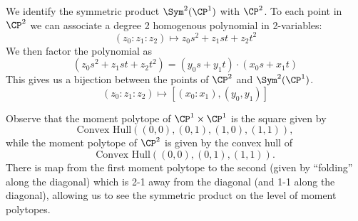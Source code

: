 


    We identify the symmetric product $\Sym^2(\CP^1)$ with $\CP^2$. To each point in $\CP^2$ we can associate a degree 2 homogenous polynomial in 2-variables:
    \[(z_0:z_1:z_2)\mapsto z_0 s^2 + z_1 st + z_2 t^2\]
    We then factor the polynomial as
    \[( z_0 s^2 + z_1 st + z_2 t^2)=(y_0 s + y_1 t)\cdot (x_0 s + x_1 t)\]
    This gives us a bijection between the points of $\CP^2$ and $\Sym^2(\CP^1)$. 
    \[(z_0:z_1:z_2)\mapsto [(x_0:x_1), (y_0,y_1)]\]
    
    Observe that the moment polytope of $\CP^1\times \CP^1$ is the square given by 
    \[\text{Convex Hull}((0,0), (0,1), (1, 0), (1, 1)),\]
    while the moment polytope of $\CP^2$ is given by the convex hull of
    \[\text{Convex Hull}((0,0), (0,1), (1,1)).\]
    There is map from the first moment polytope to the second (given by ``folding'' along the diagonal) which is 2-1 away from the diagonal (and 1-1 along the diagonal), allowing us to see the symmetric product on the level of moment polytopes.    

